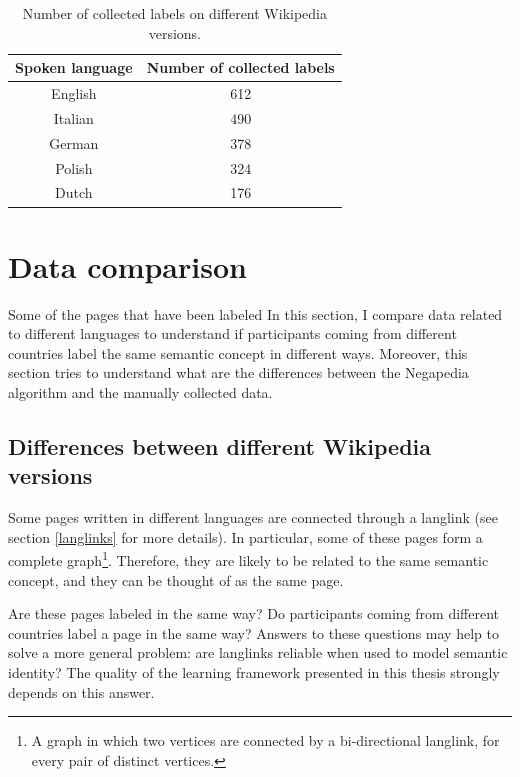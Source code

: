             \begin{table}[h]
                \centering
                \begin{tabular}{|c|c|}
                    \hline
                    Spoken language & Number of collected labels \\ \hline \hline
                    English & 612 \\ \hline
                    Italian & 490 \\ \hline
                    German & 378 \\ \hline
                    Polish & 324 \\ \hline
                    Dutch & 176 \\ \hline
                \end{tabular}
                \caption{Number of collected labels on different Wikipedia versions.}
                \label{labels_by_language}
            \end{table}
    \section{Data comparison}
        Some of the pages that have been labeled 
        In this section, I compare data related to different languages to understand if participants coming from different countries label the same semantic concept in different ways. Moreover, this section tries to understand what are the differences between the Negapedia algorithm and the manually collected data.
        \subsection{Differences between different Wikipedia versions}\label{difference_between_wikipedias}
            Some pages written in different languages are connected through a langlink (see section \ref{langlinks} for more details). In particular, some of these pages form a complete graph\footnote{A graph in which two vertices are connected by a bi-directional langlink, for every pair of distinct vertices.}. Therefore, they are likely to be related to the same semantic concept, and they can be thought of as the same page.
            
            Are these pages labeled in the same way? Do participants coming from different countries label a page in the same way? Answers to these questions may help to solve a more general problem: are langlinks reliable when used to model semantic identity? The quality of the learning framework presented in this thesis strongly depends on this answer.
            
